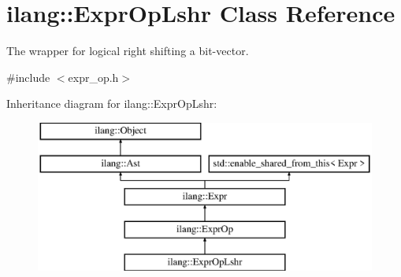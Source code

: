 \hypertarget{classilang_1_1_expr_op_lshr}{}\section{ilang\+:\+:Expr\+Op\+Lshr Class Reference}
\label{classilang_1_1_expr_op_lshr}


The wrapper for logical right shifting a bit-\/vector.  




{\ttfamily \#include $<$expr\+\_\+op.\+h$>$}

Inheritance diagram for ilang\+:\+:Expr\+Op\+Lshr\+:\begin{figure}[H]
\begin{center}
\leavevmode
\includegraphics[height=5.000000cm]{classilang_1_1_expr_op_lshr}
\end{center}
\end{figure}
